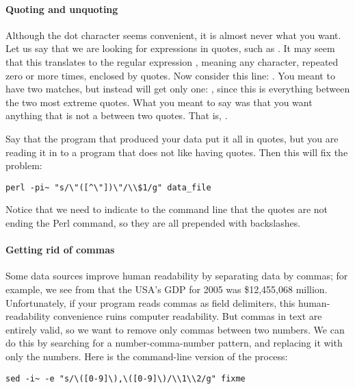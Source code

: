 \paragraph{Quoting and unquoting}
Although the dot character seems convenient, it is almost never what you
want. Let us say that we are looking for expressions in quotes,
such as . It may seem that this translates to the regular
expression , meaning any character, repeated zero or more
times, enclosed by quotes. Now consider this line: . You meant to have two matches, but instead will get only
one: , since this is everything between the
two most extreme quotes. What you meant to say was that you want anything
that is not a  between two quotes. That is, . 

Say that the program that produced your data put it all in
quotes, but you are reading it in to a  program that does not like
having quotes. Then this will fix the problem:
\begin{lstlisting}
perl -pi~ "s/\"([^\"])\"/\\$1/g" data_file
\end{lstlisting}
Notice that we need to indicate to the command line that the quotes are
not ending the Perl command, so they are all prepended with backslashes.

\paragraph{Getting rid of commas}
Some data sources improve human readability by separating data by
commas; for example, we see from  that the USA's GDP for
2005 was \$12,455,068 million. Unfortunately, if your program reads
commas as field delimiters, this human-readability convenience ruins
computer readability. But commas in text are entirely valid, so we want
to remove only commas between two numbers. We can do this by searching
for a number-comma-number pattern, and replacing it with only the
numbers. Here is the  command-line version of the process:
\begin{lstlisting}
sed -i~ -e "s/\([0-9]\),\([0-9]\)/\\1\\2/g" fixme
\end{lstlisting}

 
